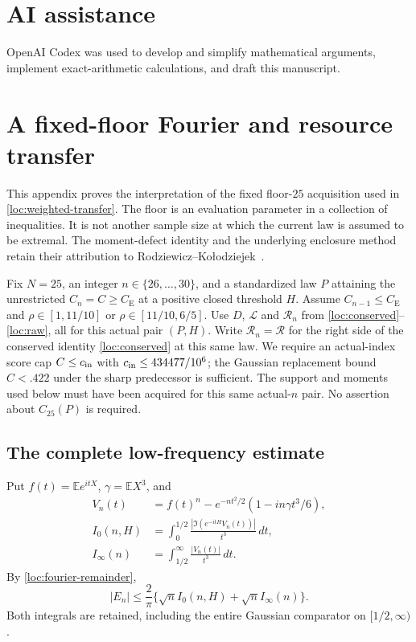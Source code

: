 \documentclass[aop,preprint]{imsart}
\theoremstyle{definition}
\newcommand{\CE}{C_{\mathrm E}}
\newcommand{\E}{\mathbb E}
\numberwithin{equation}{section}
\begin{document}
\section*{AI assistance}
OpenAI Codex was used to develop and simplify mathematical arguments,
implement exact-arithmetic calculations, and draft this manuscript.

\appendix
\section{A fixed-floor Fourier and resource transfer}\label{ut:section}

This appendix proves the interpretation of the fixed floor-$25$
acquisition used in \eqref{loc:weighted-transfer}. The floor is an
evaluation parameter in a collection of inequalities. It is not another
sample size at which the current law is assumed to be extremal.
The moment-defect identity and the underlying enclosure method retain
their attribution to Rodziewicz--Ko\l{}odziejek~\cite{RK2026}.

Fix $N=25$, an integer $n\in\{26,\ldots,30\}$, and a standardized law
$P$ attaining the unrestricted $C_n=C\ge\CE$ at a positive closed
threshold $H$. Assume $C_{n-1}\le\CE$ and
$\rho\in[1,11/10]$ or $\rho\in[11/10,6/5]$.
Use $D$, $\mathcal L$ and $\mathcal R_n$ from
\eqref{loc:conserved}--\eqref{loc:raw}, all for this actual pair $(P,H)$.
Write $\mathcal R_n=\mathcal R$ for the right side of
the conserved identity \eqref{loc:conserved} at this same law.
We require an actual-index score cap $C\le c_{\rm in}$ with
$c_{\rm in}\le434477/10^6$; the Gaussian replacement bound
$C<.422$ under the sharp predecessor is sufficient.
The support and moments used below must have been acquired for this
same actual-$n$ pair. No assertion about $C_{25}(P)$ is required.

\subsection{The complete low-frequency estimate}

Put $f(t)=\E e^{itX}$, $\gamma=\E X^3$, and
\begin{align*}
 V_n(t)&=f(t)^n-e^{-nt^2/2}(1-in\gamma t^3/6),\\
 I_0(n,H)&=\int_0^{1/2}\frac{|\Im(e^{-itH}V_n(t))|}{t^3}\,dt,\\
 I_\infty(n)&=\int_{1/2}^{\infty}\frac{|V_n(t)|}{t^3}\,dt.
\end{align*}
By \eqref{loc:fourier-remainder},
\begin{equation}\label{ut:split}
 |E_n|\le\frac2\pi\{\sqrt n I_0(n,H)+\sqrt n I_\infty(n)\}.
\end{equation}
Both integrals are retained, including the entire Gaussian comparator
on $[1/2,\infty)$.
\end{document}
